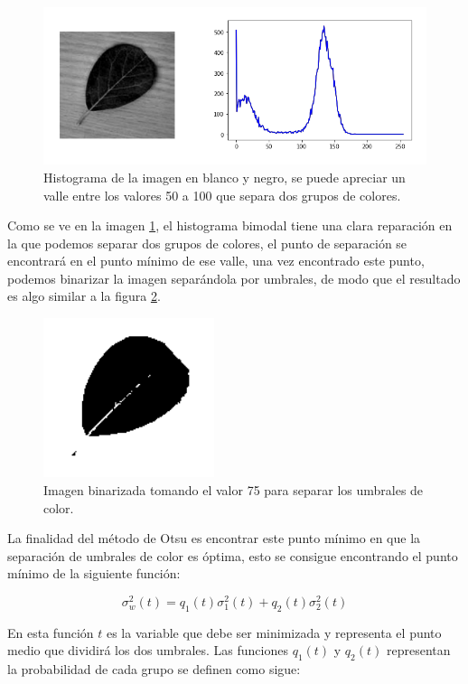 \documentclass[letter]{article}
\begin{document}
\begin{figure}[htbp]
\centering
\includegraphics[width=.9\linewidth]{./images/histogram2.png}
\caption{\label{fig:org86cdc69}Histograma de la imagen en blanco y negro, se puede apreciar un valle entre los valores 50 a 100 que separa dos grupos de colores.}
\end{figure}

Como se ve en la imagen \ref{fig:org86cdc69}, el histograma bimodal tiene una clara
reparación en la que podemos separar dos grupos de colores, el punto de
separación se encontrará en el punto mínimo de ese valle, una vez encontrado
este punto, podemos binarizar la imagen separándola por umbrales, de modo que el
resultado es algo similar a la figura \ref{fig:org624b38e}.

\begin{figure}[htbp]
\centering
\includegraphics[width=5cm]{./images/binaryleaf.png}
\caption{\label{fig:org624b38e}Imagen binarizada tomando el valor 75 para separar los umbrales de color.}
\end{figure}

La finalidad del método de Otsu es encontrar este punto mínimo en que la
separación de umbrales de color es óptima, esto se consigue encontrando el punto
mínimo de la siguiente función:

$$ \sigma_w^2(t) =  q_1(t)\sigma_1^2(t) + q_2(t)\sigma_2^2(t) $$

En esta función \(t\) es la variable que debe ser minimizada y representa el punto
medio que dividirá los dos umbrales. Las funciones \(q_1(t)\) y \(q_2(t)\)
representan la probabilidad de cada grupo se definen como sigue:
\end{document}
